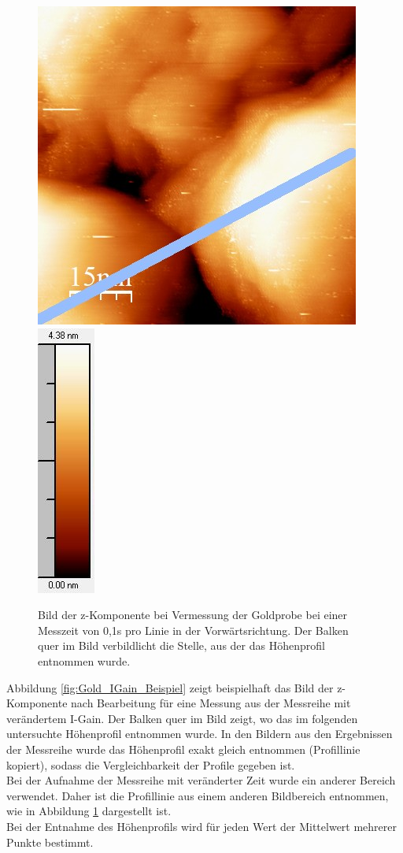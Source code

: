 \documentclass[12pt,a4paper]{article}
\begin{document}
\begin{figure}
\centering
\includegraphics[scale=0.8]{Bilder/Anhang/Zeit/0_1_Zeit_vor.jpg}
\includegraphics[scale=0.8]{Bilder/Anhang/Zeit/0_1_Zeit_vor_Skala.jpg}
\caption{Bild der z-Komponente bei Vermessung der Goldprobe bei einer Messzeit von 0,1s pro Linie in der Vorwärtsrichtung. Der Balken quer im Bild verbildlicht die Stelle, aus der das Höhenprofil entnommen wurde.}
\label{fig:Gold_Zeit_Beispiel}
\end{figure}

Abbildung \ref{fig:Gold_IGain_Beispiel} zeigt beispielhaft das Bild der z-Komponente nach Bearbeitung für eine Messung aus der Messreihe mit verändertem I-Gain. Der Balken quer im Bild zeigt, wo das im folgenden untersuchte Höhenprofil entnommen wurde. In den Bildern aus den Ergebnissen der Messreihe wurde das Höhenprofil exakt gleich entnommen (Profillinie kopiert), sodass die Vergleichbarkeit der Profile gegeben ist.\\
Bei der Aufnahme der Messreihe mit veränderter Zeit wurde ein anderer Bereich verwendet. Daher ist die Profillinie aus einem anderen Bildbereich entnommen, wie in Abbildung \ref{fig:Gold_Zeit_Beispiel} dargestellt ist.\\
Bei der Entnahme des Höhenprofils wird für jeden Wert der Mittelwert mehrerer Punkte bestimmt.
\newpage
\end{document}
